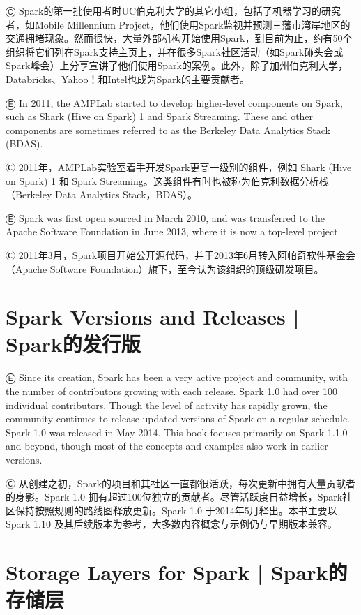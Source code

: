 Ⓒ Spark的第一批使用者时UC伯克利大学的其它小组，包括了机器学习的研究者，如Mobile Millennium Project，他们使用Spark监视并预测三藩市湾岸地区的交通拥堵现象。然而很快，大量外部机构开始使用Spark，到目前为止，约有50个组织将它们列在Spark支持主页上，并在很多Spark社区活动（如Spark碰头会或Spark峰会）上分享宣讲了他们使用Spark的案例。此外，除了加州伯克利大学，Databricks、Yahoo！和Intel也成为Spark的主要贡献者。

Ⓔ \textcolor{etc}{In 2011, the AMPLab started to develop higher-level components on Spark, such as Shark (Hive on Spark) 1 and Spark Streaming. These and other components are sometimes referred to as the Berkeley Data Analytics Stack (BDAS).}

Ⓒ 2011年，AMPLab实验室着手开发Spark更高一级别的组件，例如 Shark (Hive on Spark) 1 和 Spark Streaming。这类组件有时也被称为伯克利数据分析栈（Berkeley Data Analytics Stack，BDAS）。

Ⓔ \textcolor{etc}{Spark was first open sourced in March 2010, and was transferred to the Apache Software Foundation in June 2013, where it is now a top-level project.}

Ⓒ 2011年3月，Spark项目开始公开源代码，并于2013年6月转入阿帕奇软件基金会（Apache Software Foundation）旗下，至今认为该组织的顶级研发项目。

\section{Spark Versions and Releases  |  Spark的发行版} \label{spark-versions-and-releases}

Ⓔ \textcolor{etc}{Since its creation, Spark has been a very active project and community, with the number of contributors growing with each release. Spark 1.0 had over 100 individual contributors. Though the level of activity has rapidly grown, the community continues to release updated versions of Spark on a regular schedule. Spark 1.0 was released in May 2014. This book focuses primarily on Spark 1.1.0 and beyond, though most of the concepts and examples also work in earlier versions.}

Ⓒ 从创建之初，Spark的项目和其社区一直都很活跃，每次更新中拥有大量贡献者的身影。Spark 1.0 拥有超过100位独立的贡献者。尽管活跃度日益增长，Spark社区保持按照规则的路线图释放更新。Spark 1.0 于2014年5月释出。本书主要以Spark 1.10 及其后续版本为参考，大多数内容概念与示例仍与早期版本兼容。

\section{Storage Layers for Spark  |  Spark的存储层} \label{storage-layers-for-spark}

